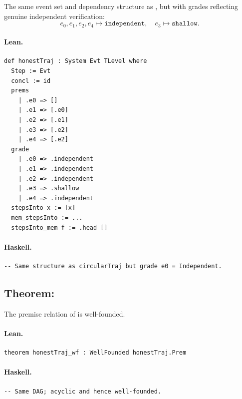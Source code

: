 \documentclass[11pt,a4paper]{article}
\begin{document}
\begin{defn}
The same event set and dependency structure as , but with
grades reflecting genuine independent verification:
\[
  e_0, e_1, e_2, e_4 \mapsto \mathtt{independent},\quad
  e_3 \mapsto \mathtt{shallow}.
\]
\end{defn}

\paragraph{Lean.}
\begin{lstlisting}[style=lean]
def honestTraj : System Evt TLevel where
  Step := Evt
  concl := id
  prems
    | .e0 => []
    | .e1 => [.e0]
    | .e2 => [.e1]
    | .e3 => [.e2]
    | .e4 => [.e2]
  grade
    | .e0 => .independent
    | .e1 => .independent
    | .e2 => .independent
    | .e3 => .shallow
    | .e4 => .independent
  stepsInto x := [x]
  mem_stepsInto := ...
  stepsInto_mem f := .head []
\end{lstlisting}

\paragraph{Haskell.}
\begin{lstlisting}[style=haskell]
-- Same structure as circularTraj but grade e0 = Independent.
\end{lstlisting}


\subsection{Theorem: }

\begin{thm}
The premise relation of  is well-founded.
\end{thm}

\paragraph{Lean.}
\begin{lstlisting}[style=lean]
theorem honestTraj_wf : WellFounded honestTraj.Prem
\end{lstlisting}

\paragraph{Haskell.}
\begin{lstlisting}[style=haskell]
-- Same DAG; acyclic and hence well-founded.
\end{lstlisting}
\end{document}
